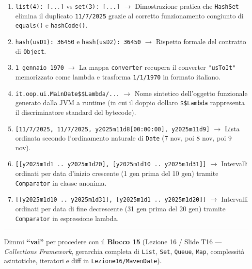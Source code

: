 \documentclass[11pt,a4paper]{article}
\newcommand{\passthrough}[1]{#1}
\providecommand{\tightlist}{\setlength{\itemsep}{0pt}\setlength{\parskip}{0pt}}
\begin{document}
\begin{enumerate}
\def\labelenumi{\arabic{enumi}.}
\tightlist
\item
  \passthrough{\lstinline!list(4): [...]!} vs
  \passthrough{\lstinline!set(3): [...]!} \(\rightarrow\) Dimostrazione
  pratica che \passthrough{\lstinline!HashSet!} elimina il duplicato
  \passthrough{\lstinline!11/7/2025!} grazie al corretto funzionamento
  congiunto di \passthrough{\lstinline!equals()!} e
  \passthrough{\lstinline!hashCode()!}.
\item
  \passthrough{\lstinline!hash(usD1): 36450!} e
  \passthrough{\lstinline!hash(usD2): 36450!} \(\rightarrow\) Rispetto
  formale del contratto di \passthrough{\lstinline!Object!}.
\item
  \passthrough{\lstinline!1 gennaio 1970!} \(\rightarrow\) La mappa
  \passthrough{\lstinline!converter!} recupera il converter
  \passthrough{\lstinline!"usToIt"!} memorizzato come lambda e trasforma
  \passthrough{\lstinline!1/1/1970!} in formato italiano.
\item
  \passthrough{\lstinline!it.oop.ui.MainDate$$Lambda/...!}
  \(\rightarrow\) Nome sintetico dell'oggetto funzionale generato dalla
  JVM a runtime (in cui il doppio dollaro
  \passthrough{\lstinline!$$Lambda!} rappresenta il discriminatore
  standard del bytecode).
\item
  \passthrough{\lstinline![11/7/2025, 11/7/2025, y2025m11d8[00:00:00], y2025m11d9]!}
  \(\rightarrow\) Lista ordinata secondo l'ordinamento naturale di
  \passthrough{\lstinline!Date!} (7 nov, poi 8 nov, poi 9 nov).
\item
  \passthrough{\lstinline![[y2025m1d1 .. y2025m1d20], [y2025m1d10 .. y2025m1d31]]!}
  \(\rightarrow\) Intervalli ordinati per data d'inizio crescente (1 gen
  prima del 10 gen) tramite \passthrough{\lstinline!Comparator!} in
  classe anonima.
\item
  \passthrough{\lstinline![[y2025m1d10 .. y2025m1d31], [y2025m1d1 .. y2025m1d20]]!}
  \(\rightarrow\) Intervalli ordinati per data di fine decrescente (31
  gen prima del 20 gen) tramite \passthrough{\lstinline!Comparator!} in
  espressione lambda.
\end{enumerate}

\begin{center}\rule{0.5\linewidth}{0.5pt}\end{center}

Dimmi \textbf{``vai''} per procedere con il \textbf{Blocco 15} (Lezione
16 / Slide T16 --- \emph{Collections Framework}, gerarchia completa di
\passthrough{\lstinline!List!}, \passthrough{\lstinline!Set!},
\passthrough{\lstinline!Queue!}, \passthrough{\lstinline!Map!},
complessità asintotiche, iteratori e diff in
\passthrough{\lstinline!Lezione16/MavenDate!}).
\end{document}
